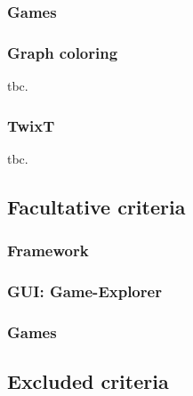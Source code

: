 \subsubsection{Games}
\subsubsection{Graph coloring}
tbc.\par

\subsubsection{TwixT}
tbc.\par

\subsection{Facultative criteria}
\subsubsection{Framework}
\subsubsection{GUI: Game-Explorer}
\subsubsection{Games}

\subsection{Excluded criteria}